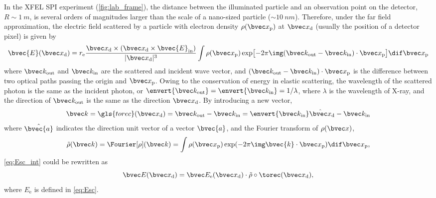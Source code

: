 In the XFEL SPI experiment (\cref{fig:lab_frame}), the distance between the illuminated particle and an observation point
on the detector, $R \sim \SI{1}{m}$, is several orders of magnitudes larger than
the scale of a nano-sized particle ($\sim\SI{10}{nm}$). Therefore, under the far field approximation\cite{jacksonClassicalElectrodynamics2007},
the electric field scattered by a particle with electron 
density $\rho(\bvec x_\text{p})$ at $\bvec x_\text{d}$ (usually the position of a detector pixel) 
is given by
\begin{equation}
    \bvec{E}(\bvec x_\text{d})=r_\text{e} \frac{\bvec x_\text{d} \times\left(\bvec x_\text{d}
    \times \bvec{E}_{\text{in}}\right)}{|\bvec x_\text{d}|^{3}}
    \int \rho(\bvec x_\text{p}) \exp\bigl[-2 \pi \img(\bvec k_\text{out} - \bvec k_\text{in})
    \cdot \bvec x_\text{p}\bigr] \dif \bvec x_\text{p} 
    \label{eq:Esc_int}
\end{equation}
where $\bvec k_\text{out}$ and $\bvec k_\text{in}$ are the scattered and incident wave vector, and
$(\bvec k_\text{out} - \bvec k_\text{in}) \cdot \bvec x_\text{p}$ is the difference between two
optical paths passing the origin and $\bvec x_\text{p}$.
Owing to the conservation of energy in elastic scattering, the wavelength of the scattered photon
is the same as the incident photon, or $\envert{\bvec k_\text{out}} = \envert{\bvec k_\text{in}}=
1/\lambda$, where $\lambda$ is the wavelength of X-ray, and the direction of $\bvec k_\text{out}$
is the same as the direction $\bvec x_\text{d}$. By introducing a new vector,
\begin{equation}
    \bvec k = \gls{torec}(\bvec x_\text{d}) = \bvec k_\text{out} - \bvec k_\text{in} = \envert{\bvec k_\text{in}}\hat{\bvec x}_\text{d} - \bvec k_\text{in}
    \label{eq:def_Krec}
\end{equation}
where $\hat{\bvec{a}}$ indicates the direction unit vector of a vector $\bvec{a}$,
and the Fourier transform of $\rho(\bvec x)$,
\begin{equation}
    \tilde{\rho}(\bvec k) = \Fourier[\rho](\bvec k)= \int \rho(\bvec x_\text{p}) \exp(- 2 \pi
    \img\bvec{k} \cdot \bvec x_\text{p}) \dif \bvec x_\text{p}\text{,}
    \label{eq:FT_rho}
\end{equation}
\cref{eq:Esc_int} could be rewritten as
\begin{equation}
    \bvec E(\bvec x_\text{d}) = \bvec E_\text{e} (\bvec x_\text{d})\cdot \tilde{\rho}\circ
    \torec(\bvec x_\text{d})\text{,}
    \label{eq:Esc_int2}
\end{equation}
where $E_\text{e}$ is defined in \cref{eq:Esc}.


